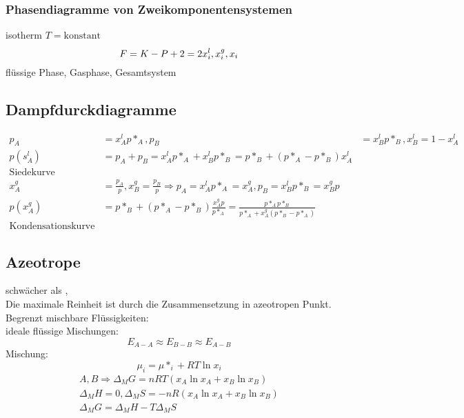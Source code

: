 \documentclass[a4paper, fleqn]{article}
\begin{document}
\subsubsection{Phasendiagramme von Zweikomponentensystemen}
isotherm $T = \mathrm{konstant}$\\
\begin{equation*}
    F = K-P+2 = 2\\
    x_i^l, x_i^g, x_i
\end{equation*}
flüssige Phase, Gasphase, Gesamtsystem\\
\subsection{Dampfdurckdiagramme}
\begin{align*}
    p_A &= x_A^l p*_A, p_B &= x_B^l p*_B, x_B^l = 1- x_A^l\\
    p(s_A^l) &= p_A + p_B = x_A^lp*_A + x_B^lp*_B = p*_B + (p*_A-p*_B)x_A^l\\
    \text{Siedekurve}\\
    x_A^g &= \frac{p_A}{p}, x_B^g = \frac{p_B}{p} \Rightarrow p_A = x_A^lp*_A = x_A^g , p_B = x_B^lp*_B=x_B^gp\\
    p(x_A^g) &= p*_B + (p*_A - p*_B)\frac{x_A^gp}{p*_A} = \frac{p*_Ap*_B}{p*_A+x_A^g(p*_B-p*_A)}\\
    \text{Kondensationskurve}
\end{align*}
\subsection{Azeotrope}
 schwächer als , \\
Die maximale Reinheit ist durch die Zusammensetzung in azeotropen Punkt.\\
Begrenzt mischbare Flüssigkeiten:\\
ideale flüssige Mischungen:
\begin{equation*}
    E_{A-A} \approx E_{B-B} \approx E_{A-B}
\end{equation*}
Mischung:
\begin{equation*}
    \mu_i = \mu*_i + RT\ln x_i
\end{equation*}
\begin{align*}
    A,B \Rightarrow \Delta_M G = nRT(x_A\ln x_A + x_B \ln x_B)\\
    \Delta_M H=0, \Delta_M S = -nR(x_A\ln x_A + x_B \ln x_B)\\
    \Delta_M G = \Delta_MH - T\Delta_MS\\  
\end{align*}
\end{document}
